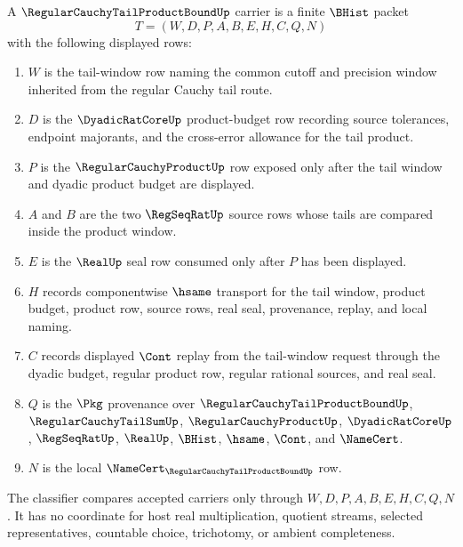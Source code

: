 \begin{definition}
\label{def:regular-cauchy-tail-product-bound-carrier}
A $\RegularCauchyTailProductBoundUp$ carrier is a finite $\BHist$ packet
$$
T=(W,D,P,A,B,E,H,C,Q,N)
$$
with the following displayed rows:
\begin{enumerate}
\item $W$ is the tail-window row naming the common cutoff and precision window inherited from the regular Cauchy tail route.
\item $D$ is the $\DyadicRatCoreUp$ product-budget row recording source tolerances, endpoint majorants, and the cross-error allowance for the tail product.
\item $P$ is the $\RegularCauchyProductUp$ row exposed only after the tail window and dyadic product budget are displayed.
\item $A$ and $B$ are the two $\RegSeqRatUp$ source rows whose tails are compared inside the product window.
\item $E$ is the $\RealUp$ seal row consumed only after $P$ has been displayed.
\item $H$ records componentwise $\hsame$ transport for the tail window, product budget, product row, source rows, real seal, provenance, replay, and local naming.
\item $C$ records displayed $\Cont$ replay from the tail-window request through the dyadic budget, regular product row, regular rational sources, and real seal.
\item $Q$ is the $\Pkg$ provenance over $\RegularCauchyTailProductBoundUp$, $\RegularCauchyTailSumUp$, $\RegularCauchyProductUp$, $\DyadicRatCoreUp$, $\RegSeqRatUp$, $\RealUp$, $\BHist$, $\hsame$, $\Cont$, and $\NameCert$.
\item $N$ is the local $\NameCert_{\RegularCauchyTailProductBoundUp}$ row.
\end{enumerate}
The classifier compares accepted carriers only through $W,D,P,A,B,E,H,C,Q,N$. It has no coordinate for host real multiplication, quotient streams, selected representatives, countable choice, trichotomy, or ambient completeness.
\end{definition}

